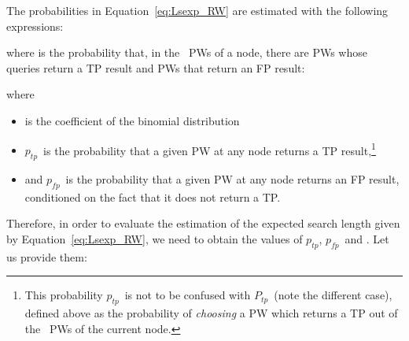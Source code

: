 \documentclass[]{elsarticle}
\newcommand{\ps} 	{\ensuremath{P_{\!t\!p}}}
\newcommand{\ptp}       {\ensuremath{p_{t\!p}}}
\newcommand{\pfp}       {\ensuremath{p_{\!f\!p}}}
\begin{document}
The probabilities in Equation~\ref{eq:Lsexp_RW} are estimated with the following expressions:



\noindent where  is the probability that, in the \w\ PWs of a node, there are  PWs whose queries return a TP result and  PWs that return an FP result:


\noindent
where 

\begin{itemize}
\item
 is the coefficient of the binomial distribution


\item
\ptp\ is the probability that a given PW at any node returns a TP result,\footnote{This probability \ptp\ is not to be confused with \ps\ (note the different case), defined above as the probability of \emph{choosing} a PW which returns a TP out of the \w\ PWs of the current node.}

\item
and  \pfp\ is the probability that a given PW at any node returns an FP result, conditioned on the fact that it does not return a TP. 

\end{itemize}

Therefore, in order to evaluate the estimation of the expected search length given by Equation~\ref{eq:Lsexp_RW}, we need to obtain the values of \ptp, \pfp\ and \Texp. Let us provide them:
\end{document}
